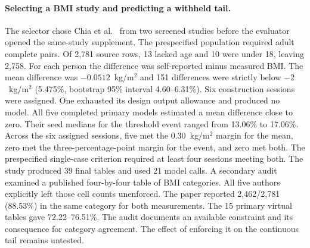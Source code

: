 \paragraph{Selecting a BMI study and predicting a withheld tail.}
The selector chose Chia et al.~\cite{chiamalaysia} from two screened studies before the evaluator opened the same-study supplement. The prespecified population required adult complete pairs. Of 2,781 source rows, 13 lacked age and 10 were under 18, leaving 2,758. For each person the difference was self-reported minus measured BMI. The mean difference was $-0.0512$~kg/m$^2$ and 151 differences were strictly below $-2$~kg/m$^2$ (5.475\%, bootstrap 95\% interval 4.60--6.31\%). Six construction sessions were assigned. One exhausted its design output allowance and produced no model. All five completed primary models estimated a mean difference close to zero. Their seed medians for the threshold event ranged from 13.06\% to 17.06\%. Across the six assigned sessions, five met the $0.30$~kg/m$^2$ margin for the mean, zero met the three-percentage-point margin for the event, and zero met both. The prespecified single-case criterion required at least four sessions meeting both. The study produced 39 final tables and used 21 model calls. A secondary audit examined a published four-by-four table of BMI categories. All five authors explicitly left those cell counts unenforced. The paper reported 2,462/2,781 (88.53\%) in the same category for both measurements. The 15 primary virtual tables gave 72.22--76.51\%. The audit documents an available constraint and its consequence for category agreement. The effect of enforcing it on the continuous tail remains untested.

